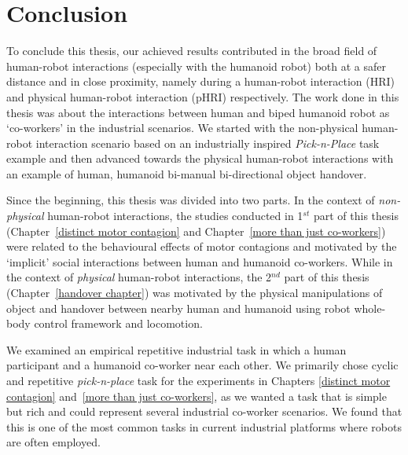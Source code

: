
{\color{blue}\chapter*{Conclusion}}
\pagestyle{plain}

To conclude this thesis, our achieved results contributed in the broad field of human-robot interactions (especially with the humanoid robot) both at a safer distance and in close proximity, namely during a human-robot interaction (HRI) and physical human-robot interaction (pHRI) respectively. The work done in this thesis was about the interactions between human and biped humanoid robot as `co-workers' in the industrial scenarios. We started with the non-physical human-robot interaction scenario based on an industrially inspired \textit{Pick-n-Place} task example and then advanced towards the physical human-robot interactions with an example of human, humanoid bi-manual bi-directional object handover.

Since the beginning, this thesis was divided into two parts. In the context of \textit{non-physical} human-robot interactions, the studies conducted in 1$^{st}$ part of this thesis (Chapter~\ref{distinct motor contagion} and Chapter~\ref{more than just co-workers}) were related to the behavioural effects of motor contagions and motivated by the `implicit' social interactions between human and humanoid co-workers. While in the context of \textit{physical} human-robot interactions, the 2$^{nd}$ part of this thesis (Chapter~\ref{handover chapter}) was motivated by the physical manipulations of object and handover between nearby human and humanoid using robot whole-body control framework and locomotion.


We examined an empirical repetitive industrial task in which a human participant and a humanoid co-worker near each other. We primarily chose cyclic and repetitive \textit{pick-n-place} task for the experiments in Chapters \ref{distinct motor contagion} and~\ref{more than just co-workers}, as we wanted a task that is simple but rich and could represent several industrial co-worker scenarios. We found that this is one of the most common tasks in current industrial platforms where robots are often employed.


